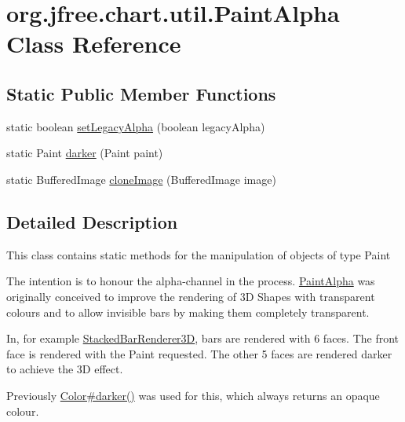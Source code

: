 \hypertarget{classorg_1_1jfree_1_1chart_1_1util_1_1_paint_alpha}{}\section{org.\+jfree.\+chart.\+util.\+Paint\+Alpha Class Reference}
\label{classorg_1_1jfree_1_1chart_1_1util_1_1_paint_alpha}
\subsection*{Static Public Member Functions}
\begin{DoxyCompactItemize}
\item 
static boolean \mbox{\hyperlink{classorg_1_1jfree_1_1chart_1_1util_1_1_paint_alpha_acf74303de013426a46c2f87033d5dc17}{set\+Legacy\+Alpha}} (boolean legacy\+Alpha)
\item 
static Paint \mbox{\hyperlink{classorg_1_1jfree_1_1chart_1_1util_1_1_paint_alpha_af68c300f097acdce3b6230a5fe4cacad}{darker}} (Paint paint)
\item 
static Buffered\+Image \mbox{\hyperlink{classorg_1_1jfree_1_1chart_1_1util_1_1_paint_alpha_a38ba8e2c54dd62310181f208019add8a}{clone\+Image}} (Buffered\+Image image)
\end{DoxyCompactItemize}


\subsection{Detailed Description}
This class contains static methods for the manipulation of objects of type {\ttfamily Paint} 

The intention is to honour the alpha-\/channel in the process. {\ttfamily \mbox{\hyperlink{classorg_1_1jfree_1_1chart_1_1util_1_1_paint_alpha}{Paint\+Alpha}}} was originally conceived to improve the rendering of 3D Shapes with transparent colours and to allow invisible bars by making them completely transparent. 

In, for example \mbox{\hyperlink{classorg_1_1jfree_1_1chart_1_1renderer_1_1category_1_1_stacked_bar_renderer3_d}{Stacked\+Bar\+Renderer3D}}, bars are rendered with 6 faces. The front face is rendered with the {\ttfamily Paint} requested. The other 5 faces are rendered darker to achieve the 3D effect. 

Previously \mbox{\hyperlink{}{Color\#darker()}} was used for this, which always returns an opaque colour. 

